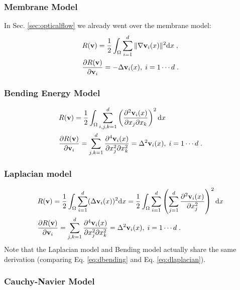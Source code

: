 \documentclass[letterpaper,12pt]{article}
\begin{document}
\subsubsection*{Membrane Model}
In Sec. \ref{sec:opticalflow} we already went over the membrane model:
\begin{align}
\label{eq:membraneA}
& R(\mathbf{v}) = \frac{1}{2} \int_\Omega \sum_{i=1}^d \| \nabla \mathbf{v}_i(x) \|^2 \text{d} x \;, \\
\label{eq:membraneAEL}
& \frac{\partial R(\mathbf{v})}{\partial \mathbf{v}_i} = -  \Delta \mathbf{v}_i(x)
, \; i=1 \cdots d \;. 
\end{align}

\subsubsection*{Bending Energy Model}
\begin{align}
& R(\mathbf{v}) = \frac{1}{2} \int_\Omega \sum_{i,j,k=1}^d  
\left( 
\frac{\partial^2 \mathbf{v}_i(x)}{\partial x_j \partial x_k}
\right)^2 \text{d} x 
\\
\label{eq:dbending}
& \frac{\partial R(\mathbf{v})}{\partial \mathbf{v}_i} 
= 
\sum_{j,k=1}^d
\frac{\partial^4 \mathbf{v}_i(x)}{\partial x_j^2 \partial x_k^2}
=
\Delta^2 \mathbf{v}_i(x)
, \; i=1 \cdots d \;. 
\end{align}

\subsubsection*{Laplacian model}
\begin{align}
& R(\mathbf{v}) = \frac{1}{2} \int_\Omega \sum_{i=1}^d (\Delta \mathbf{v}_i(x))^2 \text{d} x
= \frac{1}{2} \int_\Omega \sum_{i=1}^d  
\left( 
\sum_{j=1}^d  
\frac{\partial^2 \mathbf{v}_i(x)}{\partial x_j^2}
\right)^2 \text{d} x 
\\
\label{eq:dlaplacian}
& \frac{\partial R(\mathbf{v})}{\partial \mathbf{v}_i} 
= 
\sum_{j,k=1}^d
\frac{\partial^4 \mathbf{v}_i(x)}{\partial x_j^2 \partial x_k^2}
=
\Delta^2 \mathbf{v}_i(x)
, \; i=1 \cdots d \;. 
\end{align}
Note that the Laplacian model and Bending model \cite{Ashburner2007}
actually share the same derivation (comparing Eq. \ref{eq:dbending} and Eq. \ref{eq:dlaplacian}).

\subsubsection*{Cauchy-Navier Model}
\label{sec:cauchynaviermodel}
\end{document}
